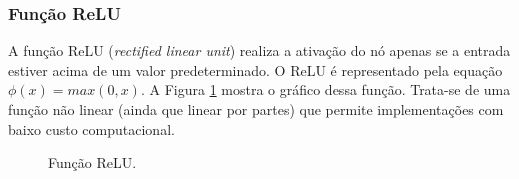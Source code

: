 \subsubsection{Função ReLU}
\label{subsec:relu}
A função ReLU (\textit{rectified linear unit}) realiza a ativação do nó apenas se a entrada estiver acima de um valor predeterminado. O ReLU é representado pela equação $\phi (x) = max(0,x)$. A Figura \ref{fig:relu} mostra o gráfico dessa função. Trata-se de uma função não linear (ainda que linear por partes) que permite implementações com baixo custo computacional.

\begin{figure}[!htb]
    \centering
    \caption{Função ReLU.}
\label{fig:relu}
\end{figure}